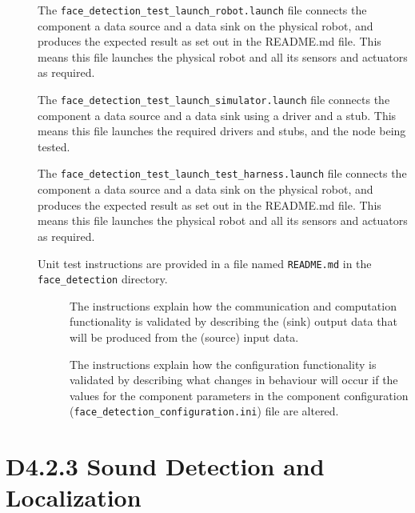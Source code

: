 \documentclass{CSSRforAfrica}
\newcommand{\checkboxChecked}{\fbox{\ding{51}}} %
\newcommand{\checkboxDashed}{\fbox{--}}         %
\begin{document}
\begin{description}
\item[\checkboxChecked] The {\small \verb+face_detection_test_launch_robot.launch+} file connects the component a data source and a data sink on the physical robot, and produces the expected result as set out in the README.md file. This means this file launches the physical robot and all its sensors and actuators as required.

\item[\checkboxDashed]   The {\small \verb+face_detection_test_launch_simulator.launch+} file connects the component a data source and a data sink using a driver and a stub. This means this file launches the required drivers and stubs, and the node being tested.

\item[\checkboxChecked]   The {\small \verb+face_detection_test_launch_test_harness.launch+} file connects the component a data source and a data sink on the physical robot, and produces the expected result as set out in the README.md file. This means this file launches the physical robot and all its sensors and actuators as required.

\item[\checkboxChecked] Unit test instructions are provided in a file named {\small \verb+README.md+} in the  {\small \verb+face_detection+} directory. 


\begin{description}

\item[\checkboxChecked] The instructions explain how the communication and computation functionality is validated by describing the (sink) output data that will be produced from the (source) input data.  

\item[\checkboxChecked] The instructions explain how the configuration functionality is validated by describing what changes in behaviour will occur if the values for the component parameters in the component configuration ({\small \verb+face_detection_configuration.ini+}) file are altered.

\end{description}
\end{description} 
\newpage



\section{D4.2.3 Sound Detection and Localization} 
\end{document}
